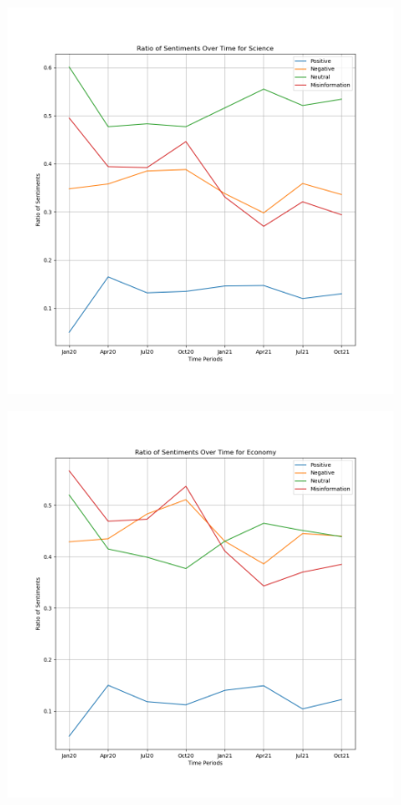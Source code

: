 \documentclass{l4proj}
\begin{document}
\begin{appendices}
\begin{figure}[H]
\begin{minipage}[c]{0.49\linewidth}
\label{fig:treatsen}
\end{minipage}
\end{figure}

\begin{figure}[H]
\begin{minipage}[c]{0.49\linewidth}
\centering
\includegraphics[width=\textwidth]{images/ScienceSentiment.png}
\label{fig:scisen}
\end{minipage}\hfill
\begin{minipage}[c]{0.49\linewidth}
\centering
\includegraphics[width=\textwidth]{images/EconomySentiment.png}

\end{minipage}
\end{figure}
\end{appendices}
\end{document}
